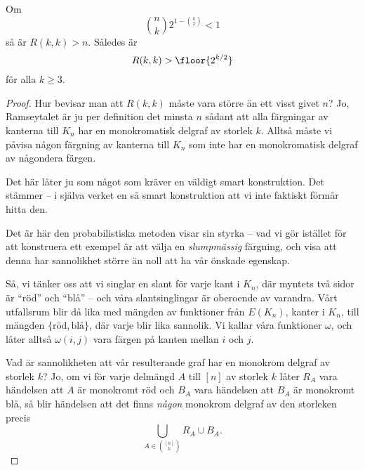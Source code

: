 \documentclass[nobib]{tufte-handout}
\begin{document}
\begin{proposition}\label{prop_ramsey_bound}
    Om
    $$\binom{n}{k}2^{1-\binom{k}{2}} < 1$$
    så är $R(k,k) > n$. Således är
    $$R(k,k) > \floor{2^{k/2}}$$
    för alla $k\geq 3$.

    \begin{proof}
        Hur bevisar man att $R(k,k)$ måste vara större än ett visst givet $n$? Jo, Ramseytalet är ju per definition det minsta $n$ sådant att alla färgningar av kanterna till $K_n$ har en monokromatisk delgraf av storlek $k$. Alltså måste vi påvisa någon färgning av kanterna till $K_n$ som inte har en monokromatisk delgraf av någondera färgen.

        Det här låter ju som något som kräver en väldigt smart konstruktion. Det stämmer -- i själva verket en så smart konstruktion att vi inte faktiskt förmår hitta den.

        Det är här den probabilistiska metoden visar sin styrka -- vad vi gör istället för att konstruera ett exempel är att välja en \emph{slumpmässig} färgning, och visa att denna har sannolikhet större än noll att ha vår önskade egenskap.

        Så, vi tänker oss att vi singlar en slant för varje kant i $K_n$, där myntets två sidor är ``röd'' och ``blå'' -- och våra slantsinglingar är oberoende av varandra. Vårt utfallsrum blir då lika med mängden av funktioner från $E(K_n)$, kanter i $K_n$, till mängden $\{\text{röd}, \text{blå}\}$, där varje blir lika sannolik. Vi kallar våra funktioner $\omega$, och låter alltså $\omega(i,j)$ vara färgen på kanten mellan $i$ och $j$.

        Vad är sannolikheten att vår resulterande graf har en monokrom delgraf av storlek $k$? Jo, om vi för varje delmängd $A$ till $[n]$ av storlek $k$ låter $R_A$ vara händelsen att $A$ är monokromt röd och $B_A$ vara händelsen att $B_A$ är monokromt blå, så blir händelsen att det finns \emph{någon} monokrom delgraf av den storleken precis
        $$\bigcup_{A \in \binom{[n]}{k}} R_A \cup B_A.$$


\end{proof}
\end{proposition}
\end{document}
